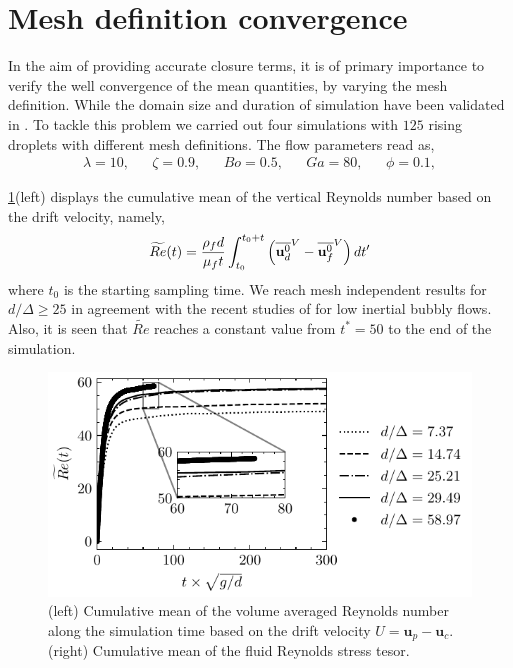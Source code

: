 \section{Mesh definition convergence}
\label{ap:convergence}


In the aim of providing accurate closure terms, it is of primary importance to verify the well convergence of the mean quantities, by varying the mesh definition. 
While the domain size and duration of simulation have been validated in \citet{fintzi2024buoyancy}.
To tackle this problem we carried out four simulations with $125$ rising droplets with different mesh definitions. 
The flow parameters read as,  
\begin{align*}
    \lambda = 10,
    && \zeta = 0.9,
    && Bo = 0.5,
    && Ga = 80,
    && \phi = 0.1,
\end{align*}

\ref{fig:Re_and_Tc}(left) displays the cumulative mean of the vertical Reynolds number based on the drift velocity, namely,
\begin{equation}
    \widetilde{Re}(t)
    = \frac{\rho_f d}{\mu_f t}\int_{t_0}^{t_0+t} \left(\overline{\textbf{u}^0_d}^V -  \overline{\textbf{u}_f^0}^V\right)dt'
\end{equation}
where $t_0$ is the starting sampling time. 
We reach mesh independent results for $d/\Delta \geq 25$ in agreement with the recent studies of \citet{hidman2023assessing} \citet{zhang2021direct} for low inertial bubbly flows.
Also, it is seen that $\widetilde{Re}$ reaches a constant value from $t^* = 50$ to the end of the simulation. 
\begin{figure}[h!]
    \centering
    \includegraphics[height = 0.35\textwidth]{image/HOMOGENEOUS_final/CA/Re.pdf}
    \caption{(left) Cumulative mean of the volume averaged Reynolds number along the simulation time based on the drift velocity $U = \textbf{u}_p - \textbf{u}_c$.
    (right) Cumulative mean of the fluid Reynolds stress tesor. }
    \label{fig:Re_and_Tc}
\end{figure}

